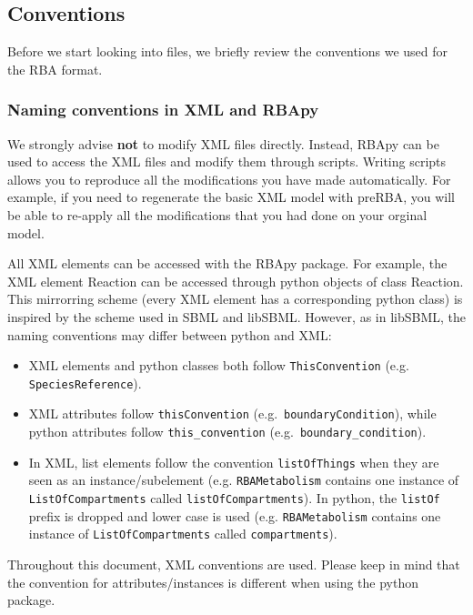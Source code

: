 \documentclass[12pt]{scrartcl}
\begin{document}
\subsection{Conventions}

Before we start looking into files, we briefly review the conventions we used for the RBA format.

\subsubsection{Naming conventions in XML and RBApy}

We strongly advise \textbf{not} to modify XML files directly.
Instead, RBApy can be used to access the XML files and modify them through scripts.
Writing scripts allows you to reproduce all the modifications you have made automatically.
For example, if you need to regenerate the basic XML model with preRBA, you will be able
to re-apply all the modifications that you had done on your orginal model.

All XML elements can be accessed with the RBApy package.
For example, the XML element Reaction can be accessed through python objects
of class Reaction.
This mirrorring scheme (every XML element has a corresponding python class) is
inspired by the scheme used in SBML and libSBML.
However, as in libSBML, the naming conventions may differ between python and XML:

\begin{itemize}
  \item XML elements and python classes both follow \texttt{ThisConvention} (e.g. \texttt{SpeciesReference}).
  \item XML attributes follow \texttt{thisConvention} (e.g.\ \texttt{boundaryCondition}), while
    python attributes follow \texttt{this\_convention} (e.g.\ \texttt{boundary\_condition}).
  \item In XML, list elements follow the convention \texttt{listOfThings}
    when they are seen as an instance/subelement
    (e.g. \texttt{RBAMetabolism} contains one instance of \texttt{ListOfCompartments} called \texttt{listOfCompartments}).
    In python, the \texttt{listOf} prefix is dropped and lower case is used
    (e.g. \texttt{RBAMetabolism} contains one instance of \texttt{ListOfCompartments} called \texttt{compartments}).
\end{itemize}

Throughout this document, XML conventions are used.
Please keep in mind that the convention for attributes/instances is different when using the
python package.
\end{document}
